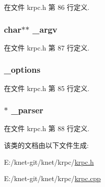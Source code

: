 在文件 krpc.\+h 第 86 行定义.

\hypertarget{classkrpc__gen__t_aff61fe53bf74f31923195e008ce82193}{}
\subsubsection[{\+\_\+argv}]{\setlength{\rightskip}{0pt plus 5cm}char$\ast$$\ast$ \+\_\+argv\hspace{0.3cm}{\ttfamily [private]}}\label{classkrpc__gen__t_aff61fe53bf74f31923195e008ce82193}


在文件 krpc.\+h 第 87 行定义.

\hypertarget{classkrpc__gen__t_a96849ab73e3d8d5a1537258893161e81}{}
\subsubsection[{\+\_\+options}]{ \+\_\+options\hspace{0.3cm}{\ttfamily [private]}}\label{classkrpc__gen__t_a96849ab73e3d8d5a1537258893161e81}


在文件 krpc.\+h 第 85 行定义.

\hypertarget{classkrpc__gen__t_a36ddbcdd9990ef301e009c81dfb703e3}{}
\subsubsection[{\+\_\+parser}]{$\ast$ \+\_\+parser\hspace{0.3cm}{\ttfamily [private]}}\label{classkrpc__gen__t_a36ddbcdd9990ef301e009c81dfb703e3}


在文件 krpc.\+h 第 88 行定义.



该类的文档由以下文件生成\+:\begin{DoxyCompactItemize}
\item 
E\+:/knet-\/git/knet/krpc/\hyperlink{krpc_8h}{krpc.\+h}\item 
E\+:/knet-\/git/knet/krpc/\hyperlink{krpc_8cpp}{krpc.\+cpp}\end{DoxyCompactItemize}
